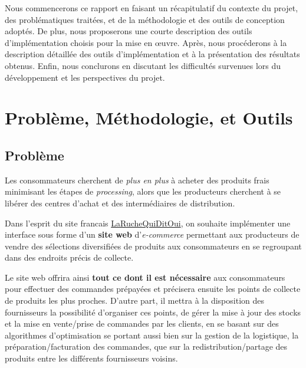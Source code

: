 \documentclass[a4paper,12pt]{report}
\theoremstyle{break}
\theoremstyle{break}
\theoremstyle{break}
\theoremstyle{break}
\theoremstyle{definition}
\theoremstyle{remark}
\begin{document}
Nous commencerons ce rapport en faisant un récapitulatif du contexte du projet, des problématiques traitées, et de la méthodologie et des outils de conception adoptés. De plus, nous proposerons une courte description des outils d'implémentation choisis pour la mise en \oe{}uvre. Après, nous procéderons à la description détaillée des outils d'implémentation et à la présentation des résultats obtenus. Enfin, nous conclurons en discutant les difficultés survenues lors du développement et les perspectives du projet.
\chapter{Problème, Méthodologie, et Outils}
\section{Problème}
Les consommateurs cherchent de \textit{plus en plus} à acheter des produits frais minimisant les étapes de \textit{processing}, alors que les producteurs cherchent à se libérer des centres d’achat et des intermédiaires de distribution.

Dans l’esprit du site francais \href{https://laruchequiditoui.fr/fr}{LaRucheQuiDitOui}, on souhaite implémenter une interface sous forme d'un \textbf{site web} d'\textit{e-commerce} permettant aux producteurs de vendre des sélections diversifiées de produits aux consommateurs en se regroupant dans des endroits précis de collecte.

Le site web offrira ainsi \textbf{tout ce dont il est nécessaire} aux consommateurs pour effectuer des commandes prépayées et précisera ensuite les points de collecte de produits les plus proches. D'autre part, il mettra à la disposition des fournisseurs la possibilité d'organiser ces points, de gérer la mise à jour des stocks et la mise en vente/prise de commandes par les clients, en se basant sur des algorithmes d'optimisation se portant aussi bien sur la gestion de la logistique, la préparation/facturation des commandes, que sur la redistribution/partage des produits entre les différents fournisseurs voisins.
\end{document}
